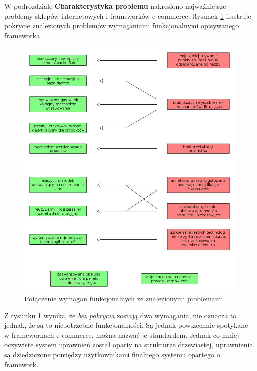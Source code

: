 W podrozdziale \textbf{Charakterystyka problemu} nakreślono najważniejsze problemy sklepów internetowych i frameworków e-commerce. Rysunek \ref{wymagania} ilustruje pokrycie znalezionych problemów wymaganiami funkcjonalnymi opisywanego frameworka.
\begin{figure}
	\begin{center}
		\includegraphics[width=1\textwidth]{wymagania.jpg}
	\end{center}
	\caption{{\color{dgray}Połączenie wymagań funkcjonalnych ze znalezionymi problemami.}} \label{wymagania}
\end{figure} 


 Z rysunku \ref{wymagania} wynika, że \textit{bez pokrycia} zostają dwa wymagania, nie oznacza to jednak, że są to niepotrzebne funkcjonalności. Są jednak powszechnie spotykane w frameworkach e-commerce, można nazwać je standardem. Jednak co mniej oczywiste system uprawnień został oparty na strukturze drzewiastej, uprawnienia są dziedziczone pomiędzy użytkownikami finalnego systemu opartego o framework.
